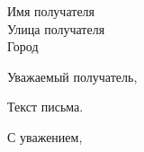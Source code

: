 \documentclass{letter}
\begin{document}
\begin{letter}{Имя получателя \\ Улица получателя \\ Город}
\opening{Уважаемый получатель,}

Текст письма.

\closing{С уважением,}

\end{letter}
\end{document}
